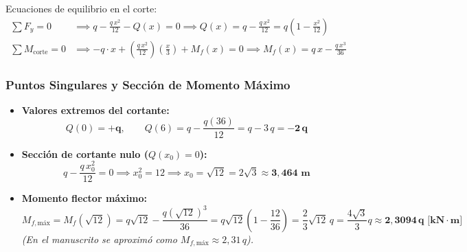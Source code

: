 Ecuaciones de equilibrio en el corte:
\begin{align}
    \sum F_y = 0 & \implies q - \frac{q\,x^2}{12} - Q(x) = 0 \implies \boxed{Q(x) = q - \frac{q\,x^2}{12} = q\left(1 - \frac{x^2}{12}\right)} \\[6pt]
    \sum M_{\text{corte}} = 0 & \implies -q \cdot x + \left(\frac{q\,x^2}{12}\right)\left(\frac{x}{3}\right) + M_f(x) = 0 \implies \boxed{M_f(x) = q\,x - \frac{q\,x^3}{36}}
\end{align}

\subsubsection*{Puntos Singulares y Sección de Momento Máximo}
\begin{itemize}
    \item \textbf{Valores extremos del cortante:}
          \[
              Q(0) = \mathbf{+q}, \qquad Q(6) = q - \frac{q(36)}{12} = q - 3\,q = \mathbf{-2\,q}
          \]
    \item \textbf{Sección de cortante nulo ($Q(x_0) = 0$):}
          \begin{equation}
              q - \frac{q\,x_0^2}{12} = 0 \implies x_0^2 = 12 \implies x_0 = \sqrt{12} = 2\sqrt{3} \approx \mathbf{3{,}464\text{ m}}
          \end{equation}
    \item \textbf{Momento flector máximo:}
          \begin{equation}
              M_{f,\text{máx}} = M_f(\sqrt{12}) = q\sqrt{12} - \frac{q(\sqrt{12})^3}{36} = q\sqrt{12} \left(1 - \frac{12}{36}\right) = \frac{2}{3}\sqrt{12}\,q = \frac{4\sqrt{3}}{3}q \approx \mathbf{2{,}3094\,q\text{ [kN}\cdot\text{m]}}
          \end{equation}
          \textit{(En el manuscrito se aproximó como $M_{f,\text{máx}} \approx 2{,}31\,q$).}
\end{itemize}


